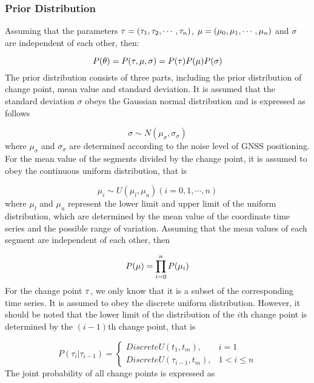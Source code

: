 \documentclass[final,3p,times]{elsarticle}
\begin{document}
	\subsubsection{Prior Distribution}
	Assuming that the parameters ${\bf{\tau }}=(\tau_1,\tau_2,\cdots,\tau_n)$, ${\bf{\mu }}=(\mu_0,\mu_1,\cdots,\mu_n)$ and $\sigma$ are independent of each other, then:
	
	\begin{equation}\label{eq_bayesian_prior}
	P({\bf{\theta }}) = P({\bf{\tau }},{\bf{\mu }},\sigma ) = P({\bf{\tau }})P({\bf{\mu }})P(\sigma )
	\end{equation}
	The prior distribution consists of three parts, including the prior distribution of change point, mean value and standard deviation. It is assumed that the standard deviation $\sigma$ obeys the Gaussian normal distribution and is expressed as follows
	
	\begin{equation}\label{eq_bayesian_prior_sigma}
	\sigma  \sim N({\mu _\sigma },{\sigma _\sigma })
	\end{equation}
	where $\mu_{\sigma}$ and $\sigma_{\sigma}$ are determined according to the noise level of GNSS positioning.
	For the mean value of the segments divided by the change point, it is assumed to obey the continuous uniform distribution, that is
	
	\begin{equation}\label{eq_bayesian_prior_mu}
	{\mu _i} \sim U({\mu_l },{\mu_u })(i = 0,1, \cdots ,n)
	\end{equation}
	where $\mu_l$ and $\mu_u$ represent the lower limit and  upper limit of the uniform distribution, which are determined by the mean value of the coordinate time series and the possible range of variation. Assuming that the mean values of each segment are independent of each other, then
	
	\begin{equation}\label{eq_bayesian_prior_mu_sum}
	P({\bf{\mu }}) = \prod\limits_{i = 0}^n {P({\mu _i})}
	\end{equation}
	For the change point ${\bf{\tau }}$, we only know that it is a subset of the corresponding time series.
	It is assumed to obey the discrete uniform distribution. However, it should be noted that the lower limit of the distribution of the $i$th change point is determined by the $(i-1)$th change point, that is
	
	\begin{equation}\label{eq_bayesian_prior_tau_basic}
	P({\tau _i}\left| {{\tau _{i - 1}}} \right.) = \left\{ {\begin{array}{*{20}{r}}
		{DiscreteU({t_1},{t_m}),}&{i = 1}\\
		{DiscreteU({\tau _{i - 1}},{t_m}),}&{1 < i \le n}
		\end{array}} \right.
	\end{equation}
	The joint probability of all change points is expressed as
	
\end{document}
